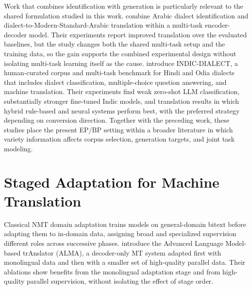 Work that combines identification with generation is particularly relevant to
the shared formulation studied in this work.
\citet{khered-etal-2025-multi} combine Arabic dialect identification and
dialect-to-Modern-Standard-Arabic translation within a multi-task
encoder-decoder model. Their experiments report improved translation over the
evaluated baselines, but the study changes both the shared multi-task setup and
the training data, so the gain supports the combined experimental design
without isolating multi-task learning itself as the cause.
\citet{sharma2026indicdialect} introduce INDIC-DIALECT, a human-curated corpus
and multi-task benchmark for Hindi and Odia dialects that includes dialect
classification, multiple-choice question answering, and machine translation.
Their experiments find weak zero-shot LLM classification, substantially
stronger fine-tuned Indic models, and translation results in which hybrid
rule-based and neural systems perform best, with the preferred strategy
depending on conversion direction. Together with the preceding work, these
studies place the present EP/BP setting within a broader literature in which
variety information affects corpus selection, generation targets, and joint
task modeling.

\section{Staged Adaptation for Machine Translation}
\label{sec:rw-sequential-adaptation-mt}

Classical NMT domain adaptation trains models on general-domain bitext before
adapting them to in-domain data, assigning broad and specialized supervision
different roles across successive phases.
\citet{xu2024paradigmshiftmachinetranslation} introduce the Advanced Language
Model-based trAnslator (ALMA), a decoder-only MT system adapted first with
monolingual data and then with a smaller set of high-quality parallel data.
Their ablations show benefits from the monolingual adaptation stage and from
high-quality parallel supervision, without isolating the effect of stage
order.

